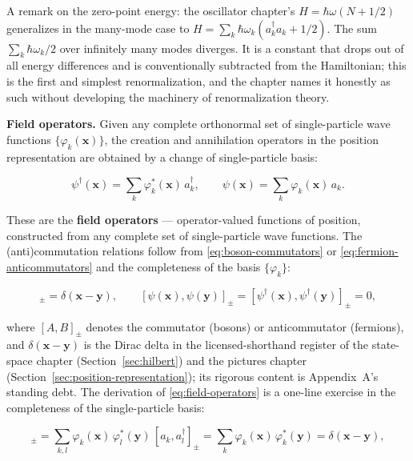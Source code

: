 A remark on the zero-point energy: the oscillator chapter's $H = \hbar\omega(N + 1/2)$ generalizes in the many-mode case to $H = \sum_k \hbar\omega_k(a_k^\dagger a_k + 1/2)$. The sum $\sum_k \hbar\omega_k/2$ over infinitely many modes diverges. It is a constant that drops out of all energy differences and is conventionally subtracted from the Hamiltonian; this is the first and simplest renormalization, and the chapter names it honestly as such without developing the machinery of renormalization theory.

\medskip\noindent\textbf{Field operators.}
Given any complete orthonormal set of single-particle wave functions $\{\varphi_k(\bm x)\}$, the creation and annihilation operators in the position representation are obtained by a change of single-particle basis:
\begin{linenomath}
    \begin{equation}
        \psi^\dagger(\bm x) = \sum_k \varphi_k^*(\bm x)\,a_k^\dagger,
        \qquad
        \psi(\bm x) = \sum_k \varphi_k(\bm x)\,a_k.
        \label{eq:field-operators}
    \end{equation}
\end{linenomath}
These are the \textbf{field operators} --- operator-valued functions of position, constructed from any complete set of single-particle wave functions. The (anti)commutation relations follow from \eqref{eq:boson-commutators} or \eqref{eq:fermion-anticommutators} and the completeness of the basis $\{\varphi_k\}$:
\begin{linenomath}
    \begin{equation}
        [\psi(\bm x), \psi^\dagger(\bm y)]_\pm = \delta(\bm x - \bm y),
        \qquad
        [\psi(\bm x), \psi(\bm y)]_\pm = [\psi^\dagger(\bm x), \psi^\dagger(\bm y)]_\pm = 0,
    \end{equation}
\end{linenomath}
where $[A, B]_\pm$ denotes the commutator (bosons) or anticommutator (fermions), and $\delta(\bm x - \bm y)$ is the Dirac delta in the licensed-shorthand register of the state-space chapter (Section~\ref{sec:hilbert}) and the pictures chapter (Section~\ref{sec:position-representation}); its rigorous content is Appendix~A's standing debt. The derivation of \eqref{eq:field-operators} is a one-line exercise in the completeness of the single-particle basis:
\begin{linenomath}
    \begin{equation*}
        [\psi(\bm x), \psi^\dagger(\bm y)]_\pm
        = \sum_{k,l} \varphi_k(\bm x)\,\varphi_l^*(\bm y)\,
          [a_k, a_l^\dagger]_\pm
        = \sum_k \varphi_k(\bm x)\,\varphi_k^*(\bm y)
        = \delta(\bm x - \bm y),
    \end{equation*}
\end{linenomath}
